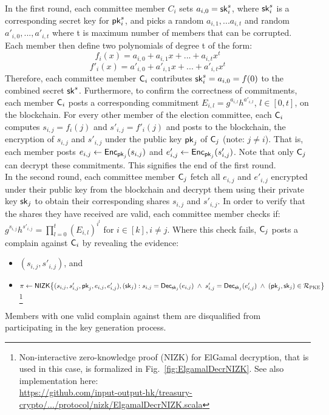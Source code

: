 In the first round, each committee member $C_i$ sets $a_{i,0}=\mathsf{sk}_i^s$, where $\mathsf{sk}_i^s$ is a corresponding secret key for $\mathsf{pk}_i^s$, and picks a random $a_{i,1},...a_{i,t} $ and random $ a'_{i,0},...,a'_{i,t}$ where t is maximum number of members that can be corrupted. Each member then define two polynomials of degree t of the form:
\[ f_i(x) = a_{i,0}+a_{i,1}x+...+a_{i,t}x^t \]
\[ f'_i(x) = a'_{i,0}+a'_{i,1}x+...+a'_{i,t}x^t \]
Therefore, each committee member $\mathsf{C}_i$ contributes $\mathsf{sk}_i^s = a_{i,0} = f(0)$ to the combined secret $\mathsf{sk}^s$.
Furthermore, to confirm the correctness of commitments, each member $\mathsf{C}_i$ posts a corresponding commitment $E_{i,l} = g^{a_{i,l}}h^{a'_{i,l}}$, $l \in [0,t]$, on the blockchain. For every other member of the election committee, each $\mathsf{C}_i$ computes $s_{i,j} = f_i(j) $ and $s'_{i,j} = f'_{i}(j) $ and posts to the blockchain, the encryption of $s_{i,j}$ and $ s'_{i,j}$ under the public key $\mathsf{pk}_j$ of $\mathsf{C}_j$ (note: $j \neq i$). That is, each member posts $e_{i,j} \leftarrow \mathsf{Enc}_{\mathsf{pk}_j}(s_{i,j})$ and $e'_{i,j} \leftarrow \mathsf{Enc}_{\mathsf{pk}_j}(s'_{i,j})$. Note that only $\mathsf{C}_j$ can decrypt these commitments. This signifies the end of the first round.\\

In the second round, each committee member $\mathsf{C}_j$ fetch all $e_{i,j}$ and $e'_{i,j}$ encrypted under their public key from the blockchain and decrypt them using their private key $\mathsf{sk}_j$ to obtain their corresponding shares $s_{i,j}$ and $ s'_{i,j}$. In order to verify that the shares they have received are valid, each committee member checks if: $g^{s_{i,j}}h^{s'_{i,j}} = \prod_{l=0}^{t}(E_{i,l})^{i^l}$ for $ i \in [k], i \neq j$.  Where this check fails, $\mathsf{C}_j$ posts a complain against $\mathsf{C}_i$ by revealing the evidence: 
\begin{itemize}
    \item $(s_{i,j},s'_{i,j})$, and
    \item $\pi\leftarrow\mathsf{NIZK}\big\{(s_{i,j}, s'_{i,j}, \mathsf{pk}_j, e_{i,j},e'_{i,j}),(\mathsf{sk}_j): \allowbreak s_{i,j}=\mathsf{Dec}_{\mathsf{sk}_j}(e_{i,j}) \; \allowbreak \wedge \; s'_{i,j}=\mathsf{Dec}_{\mathsf{sk}_j}(e'_{i,j}) \; \wedge \;  (\mathsf{pk}_j,\mathsf{sk}_j)\in\mathcal{R}_{\textsc{PKE}}\big\}$\footnote{Non-interactive zero-knowledge proof (NIZK) for ElGamal decryption, that is used in this case, is formalized in Fig.~\ref{fig:ElgamalDecrNIZK}. See also implementation here:\\ \href{https://github.com/input-output-hk/treasury-crypto/blob/master/src/main/scala/io/iohk/protocol/nizk/ElgamalDecrNIZK.scala}{https://github.com/input-output-hk/treasury-crypto/.../protocol/nizk/ElgamalDecrNIZK.scala} }
\end{itemize} 
Members with one valid complain against them are disqualified from participating in the key generation process.\\


